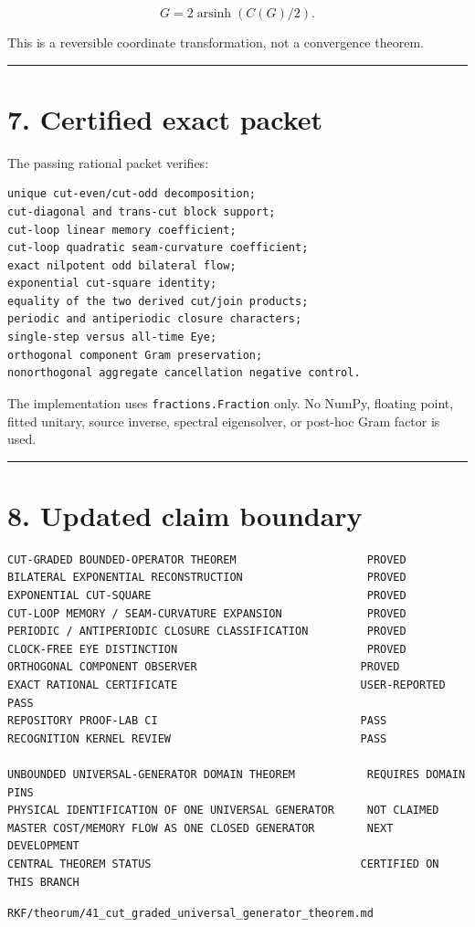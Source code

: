 \[
\boxed{
G=2\operatorname{arsinh}(C(G)/2).
}
\tag{6.1}
\]

This is a reversible coordinate transformation, not a convergence theorem.

\begin{center}\rule{0.5\linewidth}{0.5pt}\end{center}

\hypertarget{certified-exact-packet}{%
\section{7. Certified exact packet}\label{certified-exact-packet}}

The passing rational packet verifies:

\begin{verbatim}
unique cut-even/cut-odd decomposition;
cut-diagonal and trans-cut block support;
cut-loop linear memory coefficient;
cut-loop quadratic seam-curvature coefficient;
exact nilpotent odd bilateral flow;
exponential cut-square identity;
equality of the two derived cut/join products;
periodic and antiperiodic closure characters;
single-step versus all-time Eye;
orthogonal component Gram preservation;
nonorthogonal aggregate cancellation negative control.
\end{verbatim}

The implementation uses \texttt{fractions.Fraction} only. No NumPy, floating point,
fitted unitary, source inverse, spectral eigensolver, or post-hoc Gram factor is
used.

\begin{center}\rule{0.5\linewidth}{0.5pt}\end{center}

\hypertarget{updated-claim-boundary}{%
\section{8. Updated claim boundary}\label{updated-claim-boundary}}

\begin{verbatim}
CUT-GRADED BOUNDED-OPERATOR THEOREM                    PROVED
BILATERAL EXPONENTIAL RECONSTRUCTION                   PROVED
EXPONENTIAL CUT-SQUARE                                 PROVED
CUT-LOOP MEMORY / SEAM-CURVATURE EXPANSION             PROVED
PERIODIC / ANTIPERIODIC CLOSURE CLASSIFICATION         PROVED
CLOCK-FREE EYE DISTINCTION                             PROVED
ORTHOGONAL COMPONENT OBSERVER                         PROVED
EXACT RATIONAL CERTIFICATE                            USER-REPORTED PASS
REPOSITORY PROOF-LAB CI                               PASS
RECOGNITION KERNEL REVIEW                             PASS

UNBOUNDED UNIVERSAL-GENERATOR DOMAIN THEOREM           REQUIRES DOMAIN PINS
PHYSICAL IDENTIFICATION OF ONE UNIVERSAL GENERATOR     NOT CLAIMED
MASTER COST/MEMORY FLOW AS ONE CLOSED GENERATOR        NEXT DEVELOPMENT
CENTRAL THEOREM STATUS                                CERTIFIED ON THIS BRANCH
\end{verbatim}

\begin{flushright}\small\texttt{RKF/theorum/41\_cut\_graded\_universal\_generator\_theorem.md}\end{flushright}
